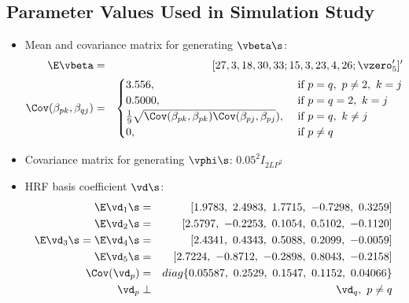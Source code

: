 \subsection*{Parameter Values Used in Simulation Study} 
\begin{itemize}
\item Mean and covariance matrix for generating $\vbeta\s$:
\vspace{-.1in}
\begin{eqnarray*}
\E\vbeta &=& [27,  3,  18, 30, 33; 15,  3, 23, 4, 26; \vzero_5']'\\
\Cov(\beta_{pk}, \beta_{qj}) &=&
\begin{cases}
3.556, &\text{ if } p=q, ~p\ne 2, ~k=j\\
0.5000, &\text{ if } p=q=2, ~k=j\\
\frac{1}{9}\sqrt{\Cov(\beta_{pk}, \beta_{pk})\Cov(\beta_{pj}, \beta_{pj}}), &\text{ if } p=q, ~k\ne j\\
0, &\text{ if } p\ne q
\end{cases}
\end{eqnarray*}

\item Covariance matrix for generating $\vphi\s$: $0.05^2I_{2LP^2}$
\item HRF basis coefficient $\vd\s$:
\begin{eqnarray*}
\E\vd_1\s &=& [1.9783, ~ 2.4983, ~ 1.7715,~ -0.7298, ~ 0.3259]\\
\E\vd_2\s &=& [2.5797, ~-0.2253,~  0.1054, ~ 0.5102,~ -0.1120]\\
\E\vd_3\s = \E\vd_4\s &=& [2.4341, ~ 0.4343, ~ 0.5088, ~ 0.2099,~ -0.0059]\\
\E\vd_5\s &=& [2.7224,~ -0.8712,~ -0.2898, ~ 0.8043,~ -0.2158]\\ 
\Cov(\vd_{p}) &=& diag\{0.05587,~ 0.2529, ~0.1547, ~0.1152, ~0.04066\}\\
\vd_{p} &\perp& \vd_{q}, ~ p\ne q
\end{eqnarray*}



\end{itemize}
